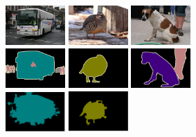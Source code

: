 {\begin{figure}
\begin{subfigure}{0.4\textwidth}
		\includegraphics[width=0.25\textwidth]{image/result/compare/2010_005284.jpg}
		\includegraphics[width=0.25\textwidth]{image/result/compare/2007_003349.jpg}
		\includegraphics[width=0.25\textwidth]{image/result/compare/2009_004507.jpg} 
		\\
		\includegraphics[width=0.25\textwidth]{image/result/compare/2010_005284.png}
		\includegraphics[width=0.25\textwidth]{image/result/compare/2007_003349.png}
		\includegraphics[width=0.25\textwidth]{image/result/compare/2009_004507.png} \\
		\includegraphics[width=0.25\textwidth]{image/result/compare/zoom_bus.png}
		\includegraphics[width=0.25\textwidth]{image/result/compare/zoom_bird.png}

\end{subfigure}
\end{figure}}
